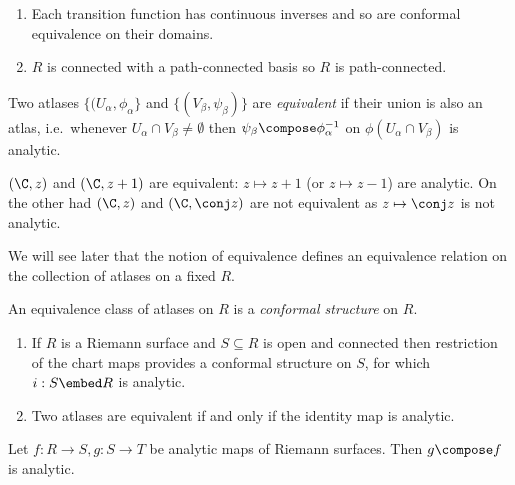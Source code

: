 \documentclass[a4paper]{article}
\begin{document}
\begin{remark}\leavevmode
  \begin{enumerate}
  \item Each transition function has continuous inverses and so are conformal equivalence on their domains.
  \item \(R\) is connected with a path-connected basis so \(R\) is path-connected.
  \end{enumerate}
\end{remark}

\begin{definition}
  Two atlases \(\{(U_\alpha, \phi_\alpha\}\) and \(\{(V_\beta, \psi_\beta)\}\) are \emph{equivalent} if their union is also an atlas, i.e.\ whenever \(U_\alpha \cap V_\beta \neq \emptyset\) then \(\psi_\beta \compose \phi_\alpha^{-1}\) on \(\phi(U_\alpha \cap V_\beta)\) is analytic.
\end{definition}

\begin{eg}
  \((\C, z)\) and \((\C, z + 1)\) are equivalent: \(z \mapsto z + 1\) (or \(z \mapsto z - 1\)) are analytic. On the other had \((\C, z)\) and \((\C, \conj z)\) are not equivalent as \(z \mapsto \conj z\) is not analytic.
\end{eg}

We will see later that the notion of equivalence defines an equivalence relation on the collection of atlases on a fixed \(R\).

\begin{definition}
  An equivalence class of atlases on \(R\) is a \emph{conformal structure} on \(R\).
\end{definition}

\begin{remark}\leavevmode
  \begin{enumerate}
  \item If \(R\) is a Riemann surface and \(S \subseteq R\) is open and connected then restriction of the chart maps provides a conformal structure on \(S\), for which \(i: S \embed R\) is analytic.
  \item Two atlases are equivalent if and only if the identity map is analytic.
  \end{enumerate}
\end{remark}

\begin{proposition}
  Let \(f: R \to S, g: S \to T\) be analytic maps of Riemann surfaces. Then \(g \compose f\) is analytic.
\end{proposition}
\end{document}
